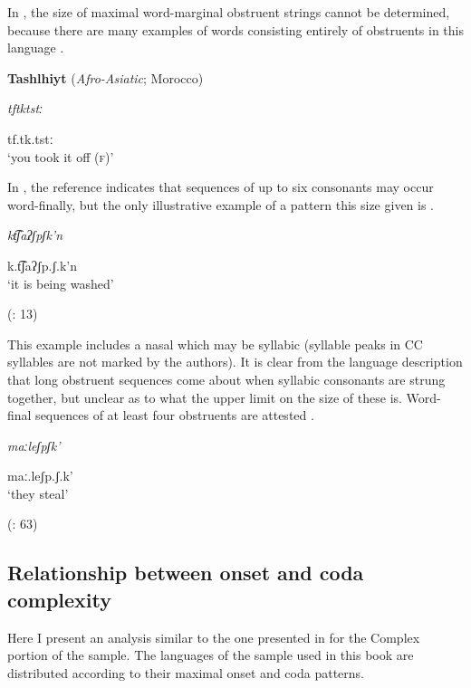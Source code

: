   In , the size of maximal word-marginal obstruent strings cannot be determined, because there are many examples of words consisting entirely of obstruents in this language . 

\ea\label{ex:3.12}
  \textbf{Tashlhiyt} (\textit{Afro-Asiatic}; Morocco)

\textit{tftktstː}

tf.tk.tstː\\
\glt ‘you took it off (\textsc{f})’
\citep[332]{Ridouane2008}
\z

In , the reference indicates that sequences of up to six consonants may occur word-finally, but the only illustrative example of a pattern this size given is .

\ea\label{ex:3.13}

\textit{kt͡ʃaʔʃpʃk’n}

k.t͡ʃaʔʃp.ʃ.k’n\\
\glt ‘it is being washed’

(\citealt{FernándezGarayHernández2006}: 13)
\z

This example includes a nasal which may be syllabic (syllable peaks in CC syllables are not marked by the authors). It is clear from the language description that long obstruent sequences come about when syllabic consonants are strung together, but unclear as to what the upper limit on the size of these is. Word-final sequences of at least four obstruents are attested .

\ea\label{ex:3.14}

\textit{maːleʃpʃk’}

maː.leʃp.ʃ.k’\\
\glt ‘they steal’

(\citealt{FernándezGarayHernández2006}: 63)
\z

\subsection{Relationship between onset and coda complexity}\label{sec:3.3.2}

  Here I present an analysis similar to the one presented in  for the Complex portion of the \citet{Maddieson2013a} sample. The languages of the sample used in this book are distributed according to their maximal onset and coda patterns.

